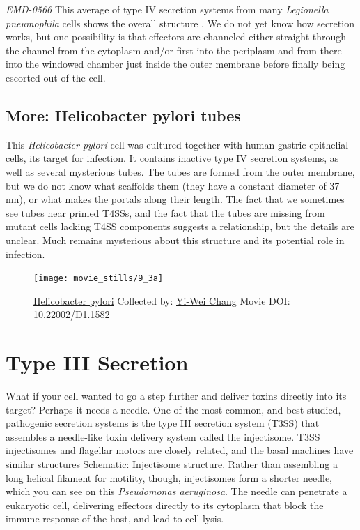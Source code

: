 \documentclass[]{tufte-book}
\begin{document}
\emph{EMD-0566} This average of type IV secretion systems from many
\emph{Legionella pneumophila} cells shows the overall structure
\citep{ghosal2019a}. We do not yet know how secretion works, but one
possibility is that effectors are channeled either straight through the
channel from the cytoplasm and/or first into the periplasm and from
there into the windowed chamber just inside the outer membrane before
finally being escorted out of the cell.

\hypertarget{Helicobacter_pylori_tubes}{\subsection*{More: Helicobacter
pylori tubes}\label{Helicobacter_pylori_tubes}}

This \emph{Helicobacter pylori} cell was cultured together with human
gastric epithelial cells, its target for infection. It contains inactive
type IV secretion systems, as well as several mysterious tubes. The
tubes are formed from the outer membrane, but we do not know what
scaffolds them (they have a constant diameter of 37 nm), or what makes
the portals along their length. The fact that we sometimes see tubes
near primed T4SSs, and the fact that the tubes are missing from mutant
cells lacking T4SS components suggests a relationship, but the details
are unclear. Much remains mysterious about this structure and its
potential role in infection.





\begin{figure}
\texttt{[image: movie\_stills/9\_3a]} \caption[\protect\hyperlink{tree}{Helicobacter pylori} Collected by:
\protect\hyperlink{yi-wei_chang}{Yi-Wei Chang} Movie DOI:
\href{https://doi.org/10.22002/D1.1582}{10.22002/D1.1582}]{\protect\hyperlink{tree}{Helicobacter pylori} Collected by:
\protect\hyperlink{yi-wei_chang}{Yi-Wei Chang} Movie DOI:
\href{https://doi.org/10.22002/D1.1582}{10.22002/D1.1582}}\label{fig:9-3a}
\end{figure}

\section{Type III Secretion}\label{type-iii-secretion}

What if your cell wanted to go a step further and deliver toxins
directly into its target? Perhaps it needs a needle. One of the most
common, and best-studied, pathogenic secretion systems is the type III
secretion system (T3SS) that assembles a needle-like toxin delivery
system called the injectisome. T3SS injectisomes and flagellar motors
are closely related, and the basal machines have similar structures
\protect\hyperlink{Injectisome_structure}{Schematic: Injectisome
structure}. Rather than assembling a long helical filament for motility,
though, injectisomes form a shorter needle, which you can see on this
\emph{Pseudomonas aeruginosa}. The needle can penetrate a eukaryotic
cell, delivering effectors directly to its cytoplasm that block the
immune response of the host, and lead to cell lysis.
\end{document}
